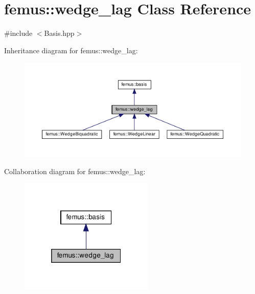 \hypertarget{classfemus_1_1wedge__lag}{}\section{femus\+:\+:wedge\+\_\+lag Class Reference}
\label{classfemus_1_1wedge__lag}


{\ttfamily \#include $<$Basis.\+hpp$>$}



Inheritance diagram for femus\+:\+:wedge\+\_\+lag\+:
\nopagebreak
\begin{figure}[H]
\begin{center}
\leavevmode
\includegraphics[width=350pt]{classfemus_1_1wedge__lag__inherit__graph}
\end{center}
\end{figure}


Collaboration diagram for femus\+:\+:wedge\+\_\+lag\+:
\nopagebreak
\begin{figure}[H]
\begin{center}
\leavevmode
\includegraphics[width=181pt]{classfemus_1_1wedge__lag__coll__graph}
\end{center}
\end{figure}
